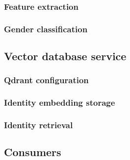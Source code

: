     \subsubsection{Feature extraction}

    \subsubsection{Gender classification}

\subsection{Vector database service}

    \subsubsection{Qdrant configuration}

    \subsubsection{Identity embedding storage}

    \subsubsection{Identity retrieval}

\subsection{Consumers}